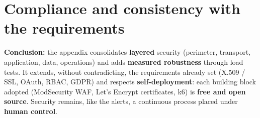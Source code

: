 \section{Compliance and consistency with the requirements}
\begin{encadre}
\textbf{Conclusion:} the appendix consolidates \textbf{layered} security
(perimeter, transport, application, data, operations) and adds \textbf{measured
robustness} through load tests. It extends, without contradicting, the
requirements already set (X.509 / SSL, OAuth, RBAC, GDPR) and respects
\textbf{self-deployment}: each building block adopted (ModSecurity WAF, Let's
Encrypt certificates, k6) is \textbf{free and open source}. Security remains,
like the alerts, a continuous process placed under \textbf{human control}.
\end{encadre}

